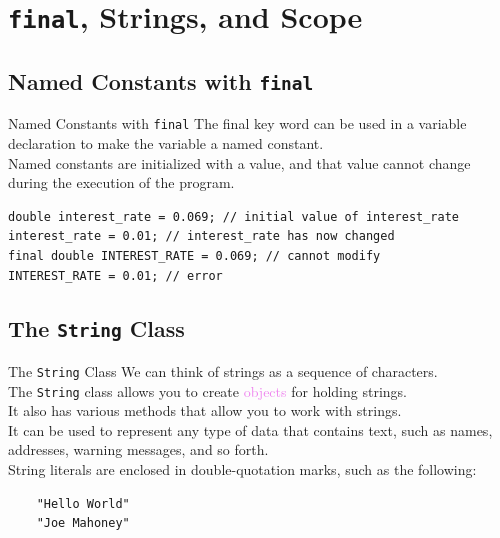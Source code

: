 \documentclass[11pt]{beamer}
\newcommand{\violet}[1]{\textcolor{violet}{#1}}
\begin{document}
\section{\texttt{final}, Strings, and Scope}
\subsection{Named Constants with \texttt{final}}
\begin{frame}[fragile]{Named Constants with \texttt{final}}
    The final key word can be used in a variable declaration to make the variable a named constant. \\ \vspace{1em}
    Named constants are initialized with a value, and that value cannot change during the execution of the program.
    \begin{lstlisting}
double interest_rate = 0.069; // initial value of interest_rate
interest_rate = 0.01; // interest_rate has now changed
final double INTEREST_RATE = 0.069; // cannot modify
INTEREST_RATE = 0.01; // error
    \end{lstlisting}
\end{frame}

\subsection{The \texttt{String} Class}
\begin{frame}[fragile]{The \texttt{String} Class}
    We can think of strings as a sequence of characters. \\ \vspace{1em}
    The \texttt{String} class allows you to create \violet{objects} for holding strings. \\ \vspace{1em}
    It also has various methods that allow you to work with strings. \\ \vspace{1em}
     It can be used to represent any type of data that contains text, such as names, addresses, warning messages, and so forth. \\ \vspace{1em}
     String literals are enclosed in double-quotation marks, such as the following:
     \begin{lstlisting}
    "Hello World"
    "Joe Mahoney"
     \end{lstlisting}
\end{frame}
\end{document}
